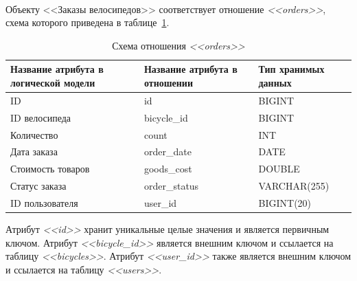 \paragraph{}
Объекту <<Заказы велосипедов>> соответствует отношение \textit{<<orders>>},
схема которого приведена в таблице~\ref{tbl:orders_scheme}.
\begin{table}[h!]
  \caption{Схема отношения \textit{<<orders>>}}
  \label{tbl:orders_scheme}
  \small{
    \centering
    \begin{tabular}{| p{} | p{} | p{} |}
      \hline
      Название атрибута в \newline логической модели &
      Название атрибута в \newline отношении &
      Тип хранимых данных \\

      \hline
      ID & id & BIGINT \\

      \hline
      ID велосипеда & bicycle\_id & BIGINT \\

      \hline
      Количество & count & INT \\

      \hline
      Дата заказа & order\_date & DATE \\

      \hline
      Стоимость товаров & goods\_cost & DOUBLE \\

      \hline
      Статус заказа & order\_status & VARCHAR(255) \\

      \hline
      ID пользователя & user\_id & BIGINT(20) \\

      \hline
    \end{tabular}
  }
\end{table}

Атрибут \textit{<<id>>} хранит уникальные целые значения и является первичным ключом.
Атрибут \textit{<<bicycle\_id>>} является внешним ключом
и ссылается на таблицу \textit{<<bicycles>>}.
Атрибут \textit{<<user\_id>>} также является внешним ключом и ссылается
на таблицу \textit{<<users>>}.

